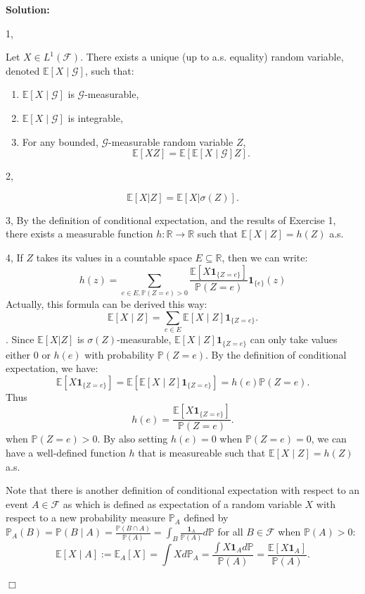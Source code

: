 \documentclass[12pt]{article}
\newenvironment{solution}{\vspace{0.2cm}\color{blue}\textbf{Solution:}}{\hfill\ensuremath{\Box}}
\begin{document}
\begin{solution}

1,

Let $X \in L^1(\mathcal{F})$. There exists a unique (up to a.s. equality) random variable, denoted $\mathbb{E}[X \mid \mathcal{G}]$, such that:
\begin{enumerate}[label=(\alph*)]
    \item $\mathbb{E}[X \mid \mathcal{G}]$ is $\mathcal{G}$-measurable,
    \item $\mathbb{E}[X \mid \mathcal{G}]$ is integrable,
    \item For any bounded, $\mathcal{G}$-measurable random variable $Z$,
    \[
        \mathbb{E}[XZ] = \mathbb{E}[\mathbb{E}[X \mid \mathcal{G}] Z].
    \]
\end{enumerate}

2,

    \[
        \mathbb{E}[X|Z] = \mathbb{E}[X | \sigma(Z)] .
    \]

3,
    By the definition of conditional expectation, and the results of Exercise 1, there exists a measurable function $h : \mathbb{R} \to \mathbb{R}$ such that $\mathbb{E}[X \mid Z] = h(Z)$ a.s. 

4,
    If $Z$ takes its values in a countable space $E \subseteq \mathbb{R}$, then we can write:
    \[
    h(z) = \sum_{e \in E,\mathbb{P}(Z = e)>0} \frac{\mathbb{E}[X \mathbf{1}_{\{Z = e\}}]}{\mathbb{P}(Z = e)} \mathbf{1}_{\{e\}}(z)
    \]
    Actually, this formula can be derived this way:
    \[
    \mathbb{E}[X \mid Z] = \sum_{e \in E} \mathbb{E}[X \mid Z]  \mathbf{1}_{\{Z = e\}}.
    \].
    Since $\mathbb{E}[X|Z]$ is $\sigma(Z)$-measurable,  $\mathbb{E}[X \mid Z]  \mathbf{1}_{\{Z = e\}}$ can only take values either $0$ or $h(e)$ with probability $\mathbb{P}(Z= e)$. By the definition of conditional expectation, we have:
    \[\mathbb{E}[X\mathbf{1}_{\{Z = e\}}]=\mathbb{E}[\mathbb{E}[X \mid Z]\mathbf{1}_{\{Z = e\}}] = h(e)\mathbb{P}(Z= e).\]
    Thus \[h(e)=\frac{\mathbb{E}[X \mathbf{1}_{\{Z = e\}}]}{\mathbb{P}(Z = e)}.\] when $\mathbb{P}(Z = e) > 0$. By also setting $h(e) = 0$ when $\mathbb{P}(Z = e) = 0$, we can have a well-defined function $h$ that is measureable such that $\mathbb{E}[X \mid Z] = h(Z)$ a.s.
    
    Note that there is another definition of conditional expectation with respect to an event $A \in \mathcal{F}$ as  which is defined as expectation of a random variable $X$ with respect to a new probability measure $\mathbb{P}_A$ defined by $\mathbb{P}_A(B) = \mathbb{P}(B \mid A)= \frac{\mathbb{P}(B \cap A)}{\mathbb{P}(A)}=\int_B \frac{\mathbf{1}_A}{\mathbb{P}(A)}d\mathbb{P}$ for all $B \in \mathcal{F}$ when $\mathbb{P}(A)>0$:
    \[\mathbb{E}[X \mid A] := \mathbb{E}_A[X]=\int Xd\mathbb{P}_A  = \frac{\int X \mathbf{1}_A d\mathbb{P}}{\mathbb{P}(A)} = \frac{\mathbb{E}[X \mathbf{1}_A]}{\mathbb{P}(A)}.\]
    

\end{solution}
\end{document}
